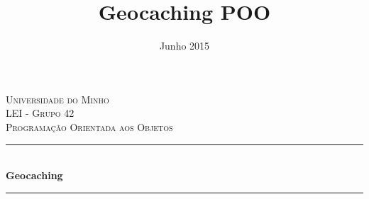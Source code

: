 \documentclass{article}
\title{Geocaching POO}
\date{Junho 2015}
\begin{document}
  \begin{titlepage}

\newcommand{\HRule}{\rule{\linewidth}{0.5mm}} %

\center %

\textsc{\LARGE Universidade do Minho}\\[1.5cm] %
\textsc{\Large LEI - Grupo 42}\\[0.5cm] %
\textsc{\large Programação Orientada aos Objetos}\\[0.5cm] %

\HRule \\[0.4cm]
{ \huge \bfseries Geocaching}\\[0.4cm] %
\HRule \\[1.5cm]


\end{titlepage}
\end{document}
